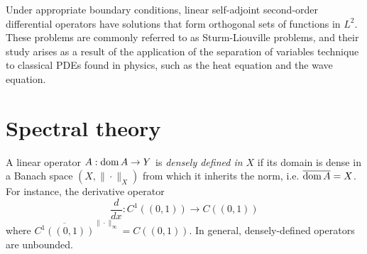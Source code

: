 Under appropriate boundary conditions, linear self-adjoint second-order differential operators have solutions that form orthogonal sets of functions in $L^2$. These problems are commonly referred to as Sturm-Liouville problems, and their study arises as a result of the application of the separation of variables technique to classical PDEs found in physics, such as the heat equation and the wave equation. 

\section{Spectral theory}

\begin{definition}
    A linear operator $A:\operatorname{\text{dom}} A \to Y$ is \textit{densely defined in $X$} if its domain is dense in a Banach space $(X,\|\cdot\|_X)$ from which it inherits the norm, i.e. $\overline{\operatorname{\text{dom}} A} = X$. For instance, the derivative operator 
    \begin{equation*}
        \frac{d}{dx}:C^1((0,1))\to C((0,1))
    \end{equation*}
    where $\overline{C^1((0,1))}^{\|\cdot\|_\infty} = C((0,1))$. In general, densely-defined operators are unbounded.
\end{definition}

